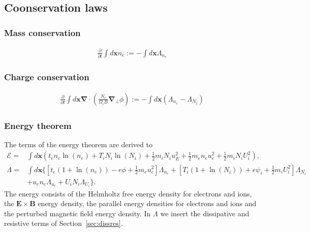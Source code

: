 \documentclass{hitec} %
\renewcommand{\vec}[1]{\boldsymbol{#1}}
\begin{document}
\subsection{Coonservation laws}
\subsubsection{Mass conservation}
\begin{align}
\frac{\partial}{\partial t} \int d\vec{x} n_e :=  - \int d\vec{x} \Lambda_{n_e}
\end{align}
\subsubsection{Charge conservation}
\begin{align}
\frac{\partial}{\partial t} \int d\vec{x} \vec{\nabla} \cdot\left(\frac{N_i}{\Omega_i B} \vec{\nabla}_\perp \phi\right) :=  - \int d\vec{x} (\Lambda_{n_e} - \Lambda_{N_i})
\end{align}
\subsubsection{Energy theorem}
The terms of the energy theorem are derived to
\begin{align}
  \mathcal{E}=&  \int  d\vec{x}  \left(t_e n_e \ln{(n_e)} +T_i N_i\ln{(N_i)}+  \frac{1}{2} m_i N_i u_E^2 +\frac{1}{2} m_e  n_e u_e^2 +\frac{1}{2} m_i  N_i U_i^2  \right),\\
\Lambda =&  \int d\vec{x} \bigg\{\left[t_e\left( 1+\ln{(n_e)}\right) -e \phi + \frac{1}{2} m_e u_e^2 \right]\Lambda_{n_e}
+\left[T_i\left( 1+\ln{(N_i)}\right) +e \psi_i + \frac{1}{2} m_i U_i^2 \right]\Lambda_{N_i}
\nonumber \\ &
+ u_e n_e \Lambda_{u_e}+U_i N_i \Lambda_{U_i}\bigg\}.
\end{align}
The energy consists of the Helmholtz free energy density for electrons and ions, the \(\vec{E} \times \vec{B}\) energy density, the parallel energy densities for electrons and ions and the perturbed magnetic field energy density.
In \(\Lambda\) we insert the dissipative and resistive terms of Section~\ref{sec:dissres}. \\
\end{document}
